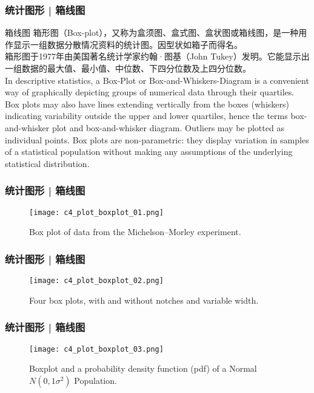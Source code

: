 \begin{frame}
  \frametitle{统计图形 | 箱线图}
  \begin{block}{箱线图}
    箱形图（Box-plot），又称为盒须图、盒式图、盒状图或箱线图，是一种用作显示一组数据分散情况资料的统计图。因型状如箱子而得名。\\
    \vspace{0.5em}
箱形图于1977年由美国著名统计学家约翰·图基（John Tukey）发明。它能显示出一组数据的最大值、最小值、中位数、下四分位数及上四分位数。\\
\vspace{0.5em}
In descriptive statistics, a Box-Plot or Box-and-Whiskers-Diagram is a convenient way of graphically depicting groups of numerical data through their quartiles. Box plots may also have lines extending vertically from the boxes (whiskers) indicating variability outside the upper and lower quartiles, hence the terms box-and-whisker plot and box-and-whisker diagram. Outliers may be plotted as individual points. Box plots are non-parametric: they display variation in samples of a statistical population without making any assumptions of the underlying statistical distribution.
  \end{block}
\end{frame}

\begin{frame}
  \frametitle{统计图形 | 箱线图}
  \begin{figure}
    \centering
    \texttt{[image: c4\_plot\_boxplot\_01.png]}
    \caption{Box plot of data from the Michelson–Morley experiment.}
  \end{figure}
\end{frame}

\begin{frame}
  \frametitle{统计图形 | 箱线图}
  \begin{figure}
    \centering
    \texttt{[image: c4\_plot\_boxplot\_02.png]}
    \caption{Four box plots, with and without notches and variable width.}
  \end{figure}
\end{frame}

\begin{frame}
  \frametitle{统计图形 | 箱线图}
  \begin{figure}
    \centering
    \texttt{[image: c4\_plot\_boxplot\_03.png]}
    \caption{Boxplot and a probability density function (pdf) of a Normal $N(0,1\sigma^2)$ Population.}
  \end{figure}
\end{frame}

